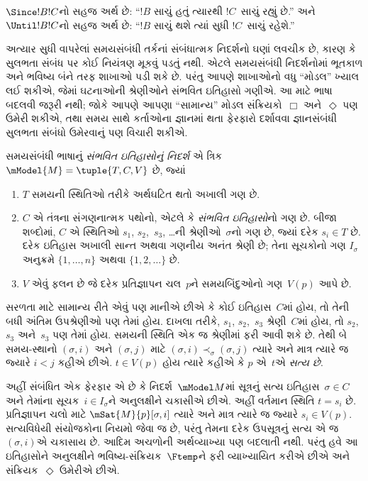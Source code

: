 $\Since  !B !C$નો સહજ અર્થ છે: ``$!B$ સાચું હતું ત્યારથી
$!C$~સાચું રહ્યું છે.'' અને $\Until !B !C$નો સહજ અર્થ છે:
``$!B$ સાચું થશે ત્યાં સુધી $!C$~સાચું રહેશે.''
\endgroup

\begingroup
\makeatletter{}\makeatother


\label{guunit:OLP-0481}


અત્યાર સુધી વાપરેલાં સમયસંબંધી તર્કનાં સંબંધાત્મક નિદર્શનો ઘણાં
લવચીક છે, કારણ કે સુલભતા સંબંધ પર કોઈ નિયંત્રણ મૂકવું પડતું નથી.
એટલે સમયસંબંધી નિદર્શનોમાં ભૂતકાળ અને ભવિષ્ય બંને તરફ શાખાઓ પડી
શકે છે. પરંતુ આપણે શાખાઓનો વધુ ``મોડલ'' ખ્યાલ લઈ શકીએ, જેમાં
ઘટનાઓની શ્રેણીઓને સંભવિત ઇતિહાસો ગણીએ. આ માટે ભાષા બદલવી જરૂરી
નથી; જોકે આપણે આપણા ``સામાન્ય'' મોડલ સંક્રિયકો~$\Box$ અને~$\Diamond$
પણ ઉમેરી શકીએ, તથા સમય સાથે કર્તાઓના જ્ઞાનમાં થતા ફેરફારો દર્શાવવા
જ્ઞાનસંબંધી સુલભતા સંબંધો ઉમેરવાનું પણ વિચારી શકીએ.

\begin{defn}
  સમયસંબંધી ભાષાનું \emph{સંભવિત ઇતિહાસોનું નિદર્શ} એ ત્રિક
  $\mModel{M} = \tuple{T, C, V}$ છે, જ્યાં
  \begin{enumerate}
    \item $T$ સમયની સ્થિતિઓ તરીકે અર્થઘટિત થતો અખાલી ગણ છે.
    \item $C$ એ તંત્રના સંગણનાત્મક પથોનો, એટલે કે \emph{સંભવિત
      ઇતિહાસો}નો ગણ છે. બીજા શબ્દોમાં, $C$ એ સ્થિતિઓ
      $s_1$, $s_2$,~$s_3$, \dots ની શ્રેણીઓ~$\sigma$નો ગણ છે,
      જ્યાં દરેક $s_i \in T$ છે. દરેક ઇતિહાસ અખાલી સાન્ત
      અથવા ગણનીય અનંત શ્રેણી છે; તેના સૂચકોનો ગણ $I_\sigma$
      અનુક્રમે $\{1,\ldots,n\}$ અથવા $\{1,2,\ldots\}$ છે.
    \item $V$ એવું ફલન છે જે દરેક પ્રતિજ્ઞાપન ચલ~$p$ને સમયબિંદુઓનો ગણ~$V(p)$ આપે છે.
  \end{enumerate}
  સરળતા માટે સામાન્ય રીતે એવું પણ માનીએ છીએ કે કોઈ ઇતિહાસ~$C$માં
  હોય, તો તેની બધી અંતિમ ઉપશ્રેણીઓ પણ તેમાં હોય. દાખલા તરીકે,
  $s_1$, $s_2$,~$s_3$ શ્રેણી~$C$માં હોય, તો $s_2$, $s_3$ અને~$s_3$
  પણ તેમાં હોય. સમયની સ્થિતિ એક જ શ્રેણીમાં ફરી આવી શકે છે.
  તેથી બે સમય-સ્થાનો $(\sigma,i)$ અને $(\sigma,j)$ માટે
  $(\sigma,i) \prec_\sigma (\sigma,j)$ ત્યારે અને માત્ર ત્યારે જ
  જ્યારે $i<j$ કહીએ છીએ.
  $t \in V(p)$ હોય ત્યારે કહીએ કે $p$ એ~$t$એ \emph{સત્ય છે}.
\end{defn}

અહીં સંબંધિત એક ફેરફાર એ છે કે નિદર્શ~$\mModel M$માં
સૂત્રનું સત્ય ઇતિહાસ~$\sigma\in C$ અને તેમાંના
સૂચક~$i\in I_\sigma$ને અનુલક્ષીને ચકાસીએ છીએ.
અહીં વર્તમાન સ્થિતિ $t=s_i$ છે. પ્રતિજ્ઞાપન ચલો માટે $\mSat{M}{p}[\sigma,i]$ ત્યારે અને માત્ર ત્યારે જ
જ્યારે $s_i\in V(p)$. સત્યવિધેયી સંયોજકોના નિયમો
 જેવા જ છે, પરંતુ તેમના દરેક ઉપસૂત્રનું
સત્ય એ જ $(\sigma,i)$એ ચકાસાય છે. આદિમ અચળોની અર્થવ્યાખ્યા પણ
બદલાતી નથી.
પરંતુ હવે આ ઇતિહાસોને અનુલક્ષીને ભવિષ્ય-સંક્રિયક~$\Ftemp$ને ફરી
વ્યાખ્યાયિત કરીએ છીએ અને સંક્રિયક~$\Diamond$ ઉમેરીએ છીએ.

